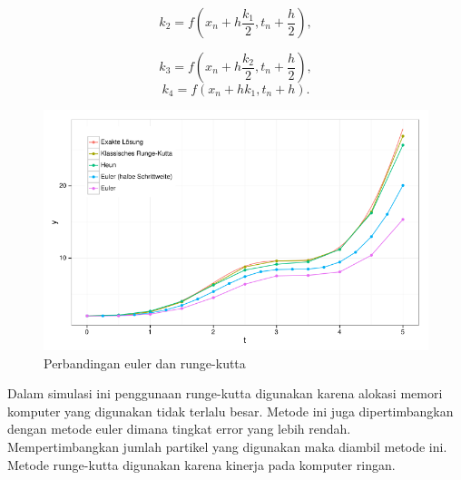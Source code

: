 \begin{equation}
k_2 = f(x_{n}+h\dfrac{k_1}{2} ,t_{n}+\dfrac{h}{2}),
\end{equation}

\begin{equation}
k_3 = f(x_{n}+h\dfrac{k_2}{2} ,t_{n}+\dfrac{h}{2}),
\end{equation}
\begin{equation}
k_4 = f(x_{n}+hk_{1} ,t_{n}+h).
\end{equation}


\begin{figure}

\centering
\includegraphics[scale=0.5]{gambar/comparison_euler}
\caption{Perbandingan euler dan runge-kutta}
\end{figure}

Dalam simulasi ini penggunaan runge-kutta digunakan karena alokasi memori komputer yang digunakan tidak terlalu besar. Metode ini juga dipertimbangkan dengan metode euler dimana tingkat error yang lebih rendah. Mempertimbangkan jumlah partikel yang digunakan maka diambil metode ini. Metode runge-kutta digunakan karena kinerja pada komputer ringan.



%
%